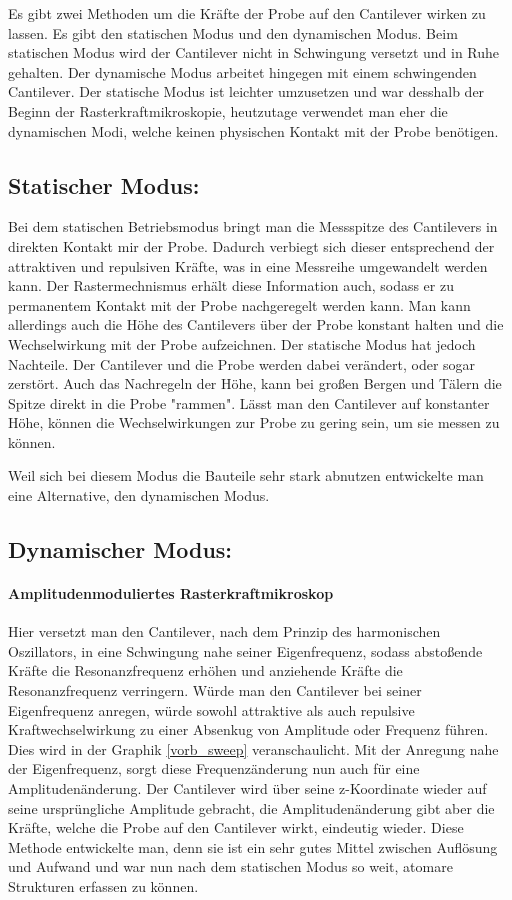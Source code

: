 Es gibt zwei Methoden um die Kräfte der Probe auf den Cantilever wirken zu lassen.
Es gibt den statischen Modus und den dynamischen Modus. 
Beim statischen Modus wird der Cantilever nicht in Schwingung versetzt und in Ruhe gehalten.
Der dynamische Modus arbeitet hingegen mit einem schwingenden Cantilever.
Der statische Modus ist leichter umzusetzen und war desshalb der Beginn der Rasterkraftmikroskopie, heutzutage verwendet man eher die dynamischen Modi, welche keinen physischen Kontakt mit der Probe benötigen.



\subsection{Statischer Modus:}

Bei dem statischen Betriebsmodus bringt man die Messspitze des Cantilevers in direkten Kontakt mir der Probe.
Dadurch verbiegt sich dieser entsprechend der attraktiven und repulsiven Kräfte, was in eine Messreihe umgewandelt werden kann.
Der Rastermechnismus erhält diese Information auch, sodass er zu permanentem Kontakt mit der Probe nachgeregelt werden kann.
Man kann allerdings auch die Höhe des Cantilevers über der Probe konstant halten und die Wechselwirkung mit der Probe aufzeichnen.
Der statische Modus hat jedoch Nachteile.
Der Cantilever und die Probe werden dabei verändert, oder sogar zerstört.
Auch das Nachregeln der Höhe, kann bei großen Bergen und Tälern die Spitze direkt in die Probe "rammen".
Lässt man den Cantilever auf konstanter Höhe, können die Wechselwirkungen zur Probe zu gering sein, um sie messen zu können.

Weil sich bei diesem Modus die Bauteile sehr stark abnutzen entwickelte man eine Alternative, den dynamischen Modus.

\subsection{Dynamischer Modus:}

       \paragraph{Amplitudenmoduliertes Rasterkraftmikroskop}

Hier versetzt man den Cantilever, nach dem Prinzip des harmonischen Oszillators, in eine Schwingung nahe seiner Eigenfrequenz, sodass abstoßende Kräfte die Resonanzfrequenz erhöhen und anziehende Kräfte die Resonanzfrequenz verringern. 
Würde man den Cantilever bei seiner Eigenfrequenz anregen, würde sowohl attraktive als auch repulsive Kraftwechselwirkung zu einer Absenkug von Amplitude oder Frequenz führen. Dies wird in der Graphik \ref{vorb_sweep} veranschaulicht.
Mit der Anregung nahe der Eigenfrequenz, sorgt diese Frequenzänderung nun auch für eine Amplitudenänderung.
Der Cantilever wird über seine z-Koordinate wieder auf seine ursprüngliche Amplitude gebracht, die Amplitudenänderung gibt aber die Kräfte, welche die Probe auf den Cantilever wirkt, eindeutig wieder.
Diese Methode entwickelte man, denn sie ist ein sehr gutes Mittel zwischen Auflösung und Aufwand und war nun nach dem statischen Modus so weit, atomare Strukturen erfassen zu können.

